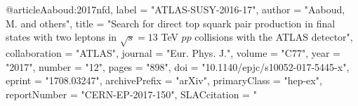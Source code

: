 @article{Aaboud:2017nfd,
      label          = "ATLAS-SUSY-2016-17",
      author         = "Aaboud, M. and others",
      title          = "{Search for direct top squark pair production in final
                        states with two leptons in $\sqrt{s} = 13$ TeV $pp$
                        collisions with the ATLAS detector}",
      collaboration  = "ATLAS",
      journal        = "Eur. Phys. J.",
      volume         = "C77",
      year           = "2017",
      number         = "12",
      pages          = "898",
      doi            = "10.1140/epjc/s10052-017-5445-x",
      eprint         = "1708.03247",
      archivePrefix  = "arXiv",
      primaryClass   = "hep-ex",
      reportNumber   = "CERN-EP-2017-150",
      SLACcitation   = "%
}

